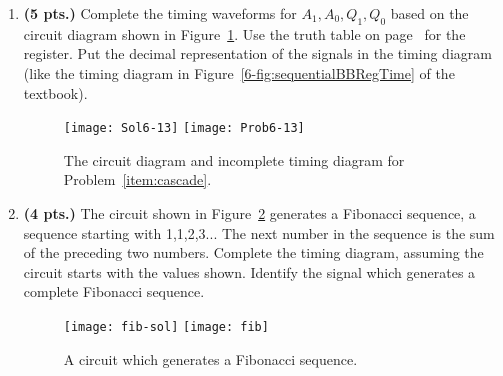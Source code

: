 \begin{enumerate}
    \item\textbf{ (5 pts.)} Complete the timing waveforms for $A_1, A_0, Q_1, Q_0$
        \label{item:cascade}
        based on the circuit diagram shown in Figure~\ref{fig:cascade}.  Use the truth
        table on page~\pageref{6-page:reg} for the register. Put the decimal
        representation of the signals in the timing diagram (like the timing
        diagram in Figure~\ref{6-fig:sequentialBBRegTime} of the textbook).\needspace{2.2in}
        \begin{figure}[ht]
            \ifshowanswers \texttt{[image: Sol6-13]}
            \else \texttt{[image: Prob6-13]} \fi
            \caption{The circuit diagram and incomplete timing diagram for
            Problem~\ref{item:cascade}.}
            \label{fig:cascade}
        \end{figure}

        \needspace{2in}
    \item\textbf{ (4 pts.)} The circuit shown in Figure~\ref{fig:fib} generates a
        Fibonacci sequence, a sequence starting with 1,1,2,3...  The next number in
        the sequence is the sum of the preceding two numbers.  Complete the
        timing diagram, assuming the circuit starts with the values shown.
        Identify the signal which generates a complete Fibonacci sequence.

        \begin{figure}[ht]
            \ifshowanswers \texttt{[image: fib-sol]}
            \else \texttt{[image: fib]} \fi
            \caption{A circuit which generates a Fibonacci sequence.}
            \label{fig:fib}
        \end{figure}

\end{enumerate}
